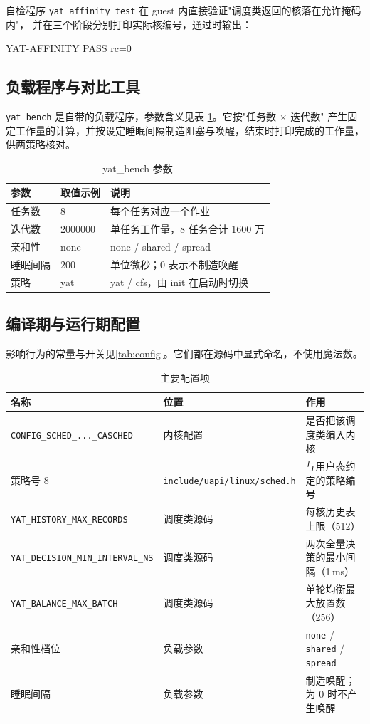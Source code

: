 \documentclass[11pt,a4paper]{article}
\newcommand{\code}[1]{\texttt{#1}}
\newenvironment{shell}{\Verbatim[fontsize=\small,frame=single,framesep=4pt]}{\endVerbatim}
\begin{document}
自检程序 \code{yat\_affinity\_test} 在 guest 内直接验证"调度类返回的核落在允许掩码内"，
并在三个阶段分别打印实际核编号，通过时输出：

\begin{shell}
YAT-AFFINITY PASS rc=0
\end{shell}

\subsection{负载程序与对比工具}

\code{yat\_bench} 是自带的负载程序，参数含义见表 \ref{tab:bench}。它按"任务数 $\times$ 迭代数"
产生固定工作量的计算，并按设定睡眠间隔制造阻塞与唤醒，结束时打印完成的工作量，供两策略核对。

\begin{table}[H]
\centering
\caption{yat\_bench 参数}
\label{tab:bench}
\small
\begin{tabular}{@{}p{3.6cm}p{2.6cm}p{8.2cm}@{}}
\toprule
参数 & 取值示例 & 说明 \\
\midrule
任务数 & 8 & 每个任务对应一个作业 \\
迭代数 & 2000000 & 单任务工作量，8 任务合计 1600 万 \\
亲和性 & none & none / shared / spread \\
睡眠间隔 & 200 & 单位微秒；0 表示不制造唤醒 \\
策略 & yat & yat / cfs，由 init 在启动时切换 \\
\bottomrule
\end{tabular}
\end{table}

\subsection{编译期与运行期配置}

影响行为的常量与开关见\autoref{tab:config}。它们都在源码中显式命名，不使用魔法数。

\begin{table}[H]
\centering
\caption{主要配置项}
\label{tab:config}
\footnotesize
\begin{tabular}{@{}p{5.2cm}p{5.6cm}p{4.4cm}@{}}
\toprule
名称 & 位置 & 作用 \\
\midrule
\code{CONFIG\_SCHED\_...\_CASCHED} & 内核配置 & 是否把该调度类编入内核 \\
策略号 8 & \code{include/uapi/linux/sched.h} & 与用户态约定的策略编号 \\
\code{YAT\_HISTORY\_MAX\_RECORDS} & 调度类源码 & 每核历史表上限（512） \\
\code{YAT\_DECISION\_MIN\_INTERVAL\_NS} & 调度类源码 & 两次全量决策的最小间隔（1\,ms） \\
\code{YAT\_BALANCE\_MAX\_BATCH} & 调度类源码 & 单轮均衡最大放置数（256） \\
亲和性档位 & 负载参数 & \code{none} / \code{shared} / \code{spread} \\
睡眠间隔 & 负载参数 & 制造唤醒；为 0 时不产生唤醒 \\
\bottomrule
\end{tabular}
\end{table}
\end{document}
